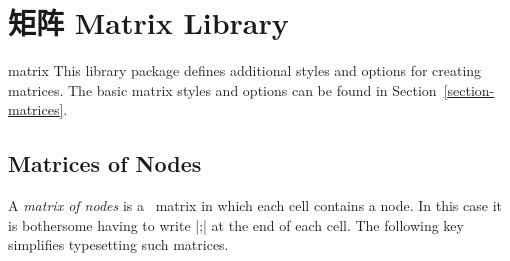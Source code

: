 %
%
%


\section{矩阵 Matrix Library}

\begin{tikzlibrary}{matrix}
    This library package defines additional styles and options for creating
    matrices. The basic matrix styles and options can be found in
    Section~\ref{section-matrices}.
\end{tikzlibrary}


\subsection{Matrices of Nodes}

A \emph{matrix of nodes} is a \tikzname\ matrix in which each cell contains a
node. In this case it is bothersome having to write |;| at the end of each cell. The following key simplifies
typesetting such matrices.

